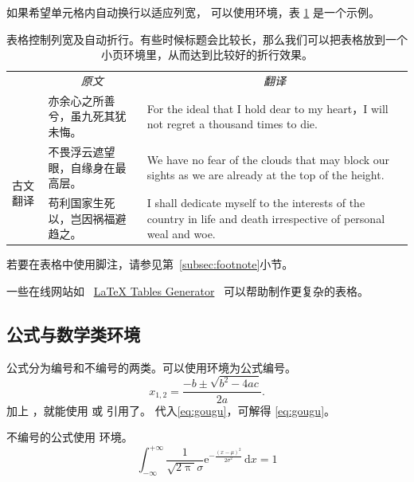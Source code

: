 如果希望单元格内自动换行以适应列宽，
可以使用环境，表 \ref{tab:tabularx} 是一个示例。
\begin{table}[htbp]
	\centering
	\begin{minipage}{0.9\textwidth}
		\caption{表格控制列宽及自动折行。有些时候标题会比较长，那么我们可以把表格放到一个小页环境里，从而达到比较好的折行效果。}
		\label{tab:tabularx}
		\begin{tabularx}{\textwidth}{p{4em}p{7.5em}X}
			\toprule
									& \multicolumn{1}{c}{\em 原文}         & \multicolumn{1}{c}{\em 翻译}                                                                                         \\
			\cmidrule(l){2-3}
									& 亦余心之所善兮，虽九死其犹未悔。 & For the ideal that I hold dear to my heart，I will not regret a thousand times to die.                           \\
			\cmidrule(l){2-3}
			\multirow{3}{*}{古文翻译} & 不畏浮云遮望眼，自缘身在最高层。 & We have no fear of the clouds that may block our sights as we are already at the top of the height.              \\
			\cmidrule(l){2-3}
									& 苟利国家生死以，岂因祸福避趋之。 & I shall dedicate myself to the interests of the country in life and death irrespective of personal weal and woe. \\
			\bottomrule
		\end{tabularx}
	\end{minipage}
\end{table}

若要在表格中使用脚注，请参见第~\ref{subsec:footnote}小节。

一些在线网站如
~\href{http://www.tablesgenerator.com}{LaTeX Tables Generator}~
可以帮助制作更复杂的表格。


\subsection{公式与数学类环境}\label{subsec:eqandmath}
公式分为编号和不编号的两类。可以使用环境为公式编号。
\begin{equation}\label{eq:gougu}
	x_{1,2}=\frac{{-b \pm \sqrt{{b^2}-4ac}}}{{2a}}.
\end{equation}
加上 ，就能使用 或 引用了。
代入\ref{eq:gougu}，可解得 \eqref{eq:gougu}。

不编号的公式使用  环境。
\begin{equation*}
	\int_{-\infty}^{+\infty}\frac{1}{\sqrt{2\uppi}\sigma}		%
	\mathrm{e}^{-\tfrac{(x-\mu)^2}{2\sigma^2}} \,\mathrm{d}x =1
\end{equation*}

